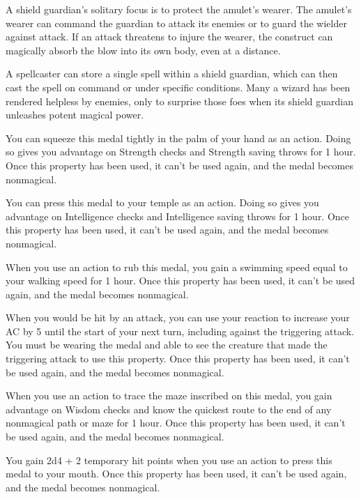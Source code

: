 \documentclass[10pt,a4paper,twoside,fancy,bg=print,twocolumn,openany,nodeprecatedcode]{dndbook}
\begin{document}
A shield guardian's solitary focus is to protect the amulet's wearer. The amulet's wearer can command the guardian to attack its enemies or to guard the wielder against attack. If an attack threatens to injure the wearer, the construct can magically absorb the blow into its own body, even at a distance.

A spellcaster can store a single spell within a shield guardian, which can then cast the spell on command or under specific conditions. Many a wizard has been rendered helpless by enemies, only to surprise those foes when its shield guardian unleashes potent magical power.

You can squeeze this medal tightly in the palm of your hand as an action. Doing so gives you advantage on Strength checks and Strength saving throws for 1 hour. Once this property has been used, it can't be used again, and the medal becomes nonmagical.

You can press this medal to your temple as an action. Doing so gives you advantage on Intelligence checks and Intelligence saving throws for 1 hour. Once this property has been used, it can't be used again, and the medal becomes nonmagical.

When you use an action to rub this medal, you gain a swimming speed equal to your walking speed for 1 hour. Once this property has been used, it can't be used again, and the medal becomes nonmagical.

When you would be hit by an attack, you can use your reaction to increase your AC by 5 until the start of your next turn, including against the triggering attack. You must be wearing the medal and able to see the creature that made the triggering attack to use this property. Once this property has been used, it can't be used again, and the medal becomes nonmagical.

When you use an action to trace the maze inscribed on this medal, you gain advantage on Wisdom checks and know the quickest route to the end of any nonmagical path or maze for 1 hour. Once this property has been used, it can't be used again, and the medal becomes nonmagical.

You gain 2d4 + 2 temporary hit points when you use an action to press this medal to your mouth. Once this property has been used, it can't be used again, and the medal becomes nonmagical.
\end{document}
